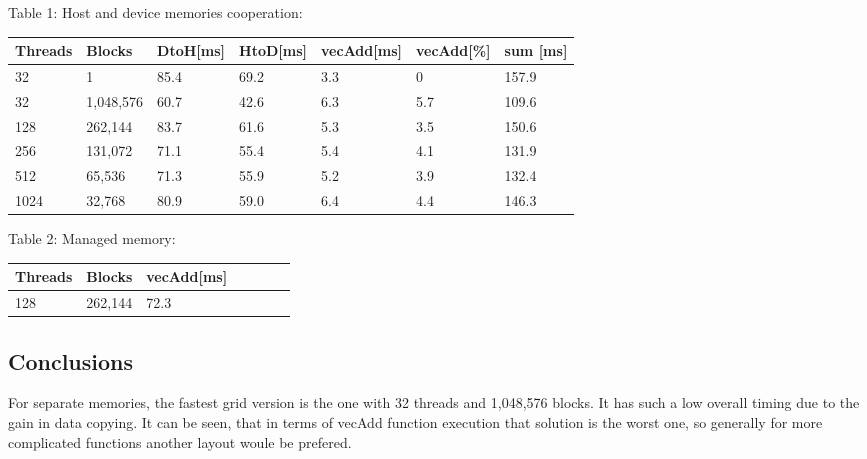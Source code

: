 \documentclass[12pt]{article}
\begin{document}
Table 1: Host and device memories cooperation:
\begin{table}[h]
\begin{tabular}{|l|l|l|l|l|l|l|}
\hline
\textbf{Threads} & \textbf{Blocks} & \textbf{DtoH{[}ms{]}} & \textbf{HtoD{[}ms{]}} & \textbf{vecAdd{[}ms{]}} & \textbf{vecAdd{[}\%{]}} & \textbf{sum {[}ms{]}} \\ \hline
32               & 1               & 85.4                      & 69.2                      & 3.3                     & 0                       & 157.9                 \\ \hline
32               & 1,048,576       & 60.7                      & 42.6                      & 6.3                     & 5.7                     & 109.6                 \\ \hline
128              & 262,144         & 83.7                      & 61.6                      & 5.3                     & 3.5                     & 150.6                 \\ \hline
256              & 131,072         & 71.1                      & 55.4                      & 5.4                     & 4.1                     & 131.9                 \\ \hline
512              & 65,536          & 71.3                      & 55.9                      & 5.2                     & 3.9                     & 132.4                 \\ \hline
1024             & 32,768          & 80.9                      & 59.0                      & 6.4                     & 4.4                     & 146.3                 \\ \hline
\end{tabular}
\end{table}

\newpage
Table 2: Managed memory:
\begin{table}[h]
\begin{tabular}{|l|l|l|l|l|l|l|}
\hline
\textbf{Threads} & \textbf{Blocks} & \textbf{vecAdd{[}ms{]}} \\ \hline
128               & 262,144               & 72.3             \\ \hline
\end{tabular}
\end{table}
\subsection{Conclusions}
For separate memories, the fastest grid version is the one with 32 threads and 1,048,576 blocks. It has such a low overall timing due to the gain in data copying. It can be seen, that in terms of vecAdd function execution that solution is the worst one, so generally for more complicated functions another layout woule be prefered.
\end{document}

